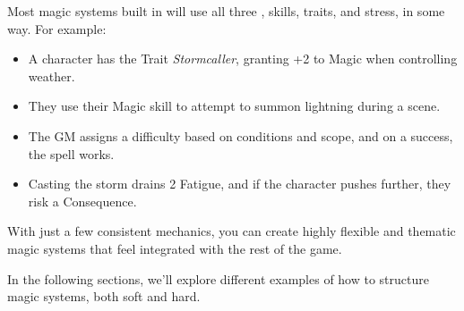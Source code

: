 Most magic systems built in \wyrd will use all three , skills, traits, and stress, in some way. For example:

\begin{itemize}
    \item A character has the Trait \textit{Stormcaller}, granting +2 to Magic when controlling weather.
    \item They use their Magic skill to attempt to summon lightning during a scene.
    \item The GM assigns a difficulty based on conditions and scope, and on a success, the spell works.
    \item Casting the storm drains 2 Fatigue, and if the character pushes further, they risk a Consequence.
\end{itemize}

With just a few consistent mechanics, you can create highly flexible and thematic magic systems that feel integrated with the rest of the game.

In the following sections, we’ll explore different examples of how to structure magic systems, both soft and hard.
